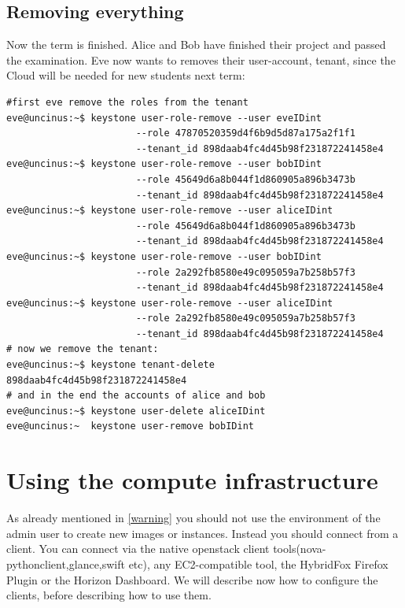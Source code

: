 \documentclass[a4paper,ngerman,bibtotocliststotoc]{scrartcl}
\begin{document}
\subsection{Removing everything}
\label{sec:removing-everything}
Now the term is finished. Alice and Bob have finished their project and
passed the examination. Eve now wants to removes their user-account,
tenant, since the Cloud will be needed for new students next term:
\begin{verbatim}
#first eve remove the roles from the tenant
eve@uncinus:~$ keystone user-role-remove --user eveIDint    
                       --role 47870520359d4f6b9d5d87a175a2f1f1 
                       --tenant_id 898daab4fc4d45b98f231872241458e4
eve@uncinus:~$ keystone user-role-remove --user bobIDint    
                       --role 45649d6a8b044f1d860905a896b3473b 
                       --tenant_id 898daab4fc4d45b98f231872241458e4
eve@uncinus:~$ keystone user-role-remove --user aliceIDint  
                       --role 45649d6a8b044f1d860905a896b3473b 
                       --tenant_id 898daab4fc4d45b98f231872241458e4
eve@uncinus:~$ keystone user-role-remove --user bobIDint    
                       --role 2a292fb8580e49c095059a7b258b57f3 
                       --tenant_id 898daab4fc4d45b98f231872241458e4
eve@uncinus:~$ keystone user-role-remove --user aliceIDint  
                       --role 2a292fb8580e49c095059a7b258b57f3 
                       --tenant_id 898daab4fc4d45b98f231872241458e4
# now we remove the tenant:
eve@uncinus:~$ keystone tenant-delete  898daab4fc4d45b98f231872241458e4
# and in the end the accounts of alice and bob
eve@uncinus:~$ keystone user-delete aliceIDint
eve@uncinus:~  keystone user-remove bobIDint
\end{verbatim}

\section{Using the compute infrastructure}
\label{sec:using-comp-infr}

As already mentioned in \ref{warning} you should not use
the environment of the admin user to create new images or
instances. Instead you should connect from a client. You can connect
via the native openstack client tools(nova-pythonclient,glance,swift etc), any EC2-compatible tool, the HybridFox
Firefox Plugin or the Horizon Dashboard. We will describe now how to
configure the clients, before describing how to use them.\\
\end{document}
